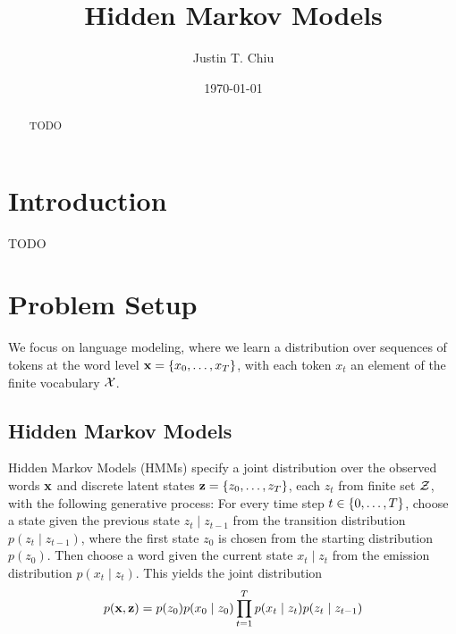 \documentclass[12pt]{article}
\title{Hidden Markov Models}
\author{
Justin T. Chiu
}
\date{\today}
\begin{document}
\maketitle

\begin{abstract}
TODO
\end{abstract}

\section{Introduction}
TODO

\section{Problem Setup}
We focus on language modeling,
where we learn a distribution over sequences of tokens
at the word level $\mathbf{x} = \left\{x_0, \ldots, x_T\right\}$, with each token $x_t$
an element of the finite vocabulary $\mathcal{X}$.

\subsection{Hidden Markov Models}
Hidden Markov Models (HMMs) specify a joint distribution over 
the observed words $\mathbf{x}$ and discrete latent states $\mathbf{z} = \left\{z_0, \ldots, z_T\right\}$,
each $z_t$ from finite set $\mathcal{Z}$,
with the following generative process:
For every time step $t \in \left\{0,\ldots,T\right\}$, choose a state given the previous state
$z_t \mid z_{t-1}$ from the transition distribution $p(z_t \mid z_{t-1})$,
where the first state $z_0$ is chosen from the starting distribution $p(z_0)$.
Then choose a word given the current state $x_t \mid z_t$ from the emission distribution $p(x_t \mid z_t)$.
This yields the joint distribution
\begin{equation}
p(\mathbf{x}, \mathbf{z})
= p(z_0)p(x_0 \mid z_0)\prod_{t=1}^T p(x_t\mid z_t)p(z_t \mid z_{t-1})
\end{equation}


\end{document}
